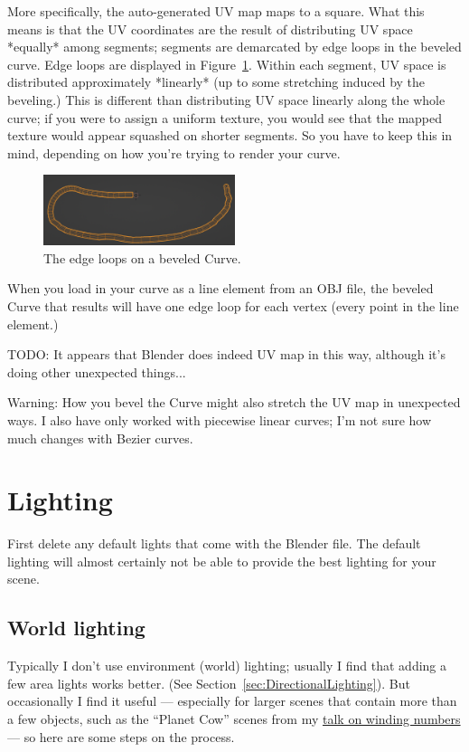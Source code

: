 \documentclass[10pt]{article}
\begin{document}
More specifically, the auto-generated UV map maps to a square. What this means is that the UV coordinates are the result of distributing UV space *equally* among segments; segments are demarcated by edge loops in the beveled curve. Edge loops are displayed in Figure~\ref{fig:curve_edge_loops}. Within each segment, UV space is distributed approximately *linearly* (up to some stretching induced by the beveling.) This is different than distributing UV space linearly along the whole curve; if you were to assign a uniform texture, you would see that the mapped texture would appear squashed on shorter segments. So you have to keep this in mind, depending on how you're trying to render your curve.
\begin{figure}[H]
    \centering
    \includegraphics[width=0.5\textwidth]{images/curve_edge_loops.png}
    \caption{The edge loops on a beveled Curve.}
    \label{fig:curve_edge_loops}
\end{figure}
When you load in your curve as a line element from an OBJ file, the beveled Curve that results will have one edge loop for each vertex (every point in the line element.)

TODO: It appears that Blender does indeed UV map in this way, although it's doing other unexpected things...

Warning: How you bevel the Curve might also stretch the UV map in unexpected ways. I also have only worked with piecewise linear curves; I'm not sure how much changes with Bezier curves.

\section{Lighting}
\label{sec:Lighting}
First delete any default lights that come with the Blender file. The default lighting will almost certainly not be able to provide the best lighting for your scene.

\subsection{World lighting}

Typically I don't use environment (world) lighting; usually I find that adding a few area lights works better. (See Section~\ref{sec:DirectionalLighting}). But occasionally I find it useful --- especially for larger scenes that contain more than a few objects, such as the ``Planet Cow'' scenes from my \href{https://nzfeng.github.io/research/WNoDS/index.html}{talk on winding numbers} --- so here are some steps on the process.
\end{document}
